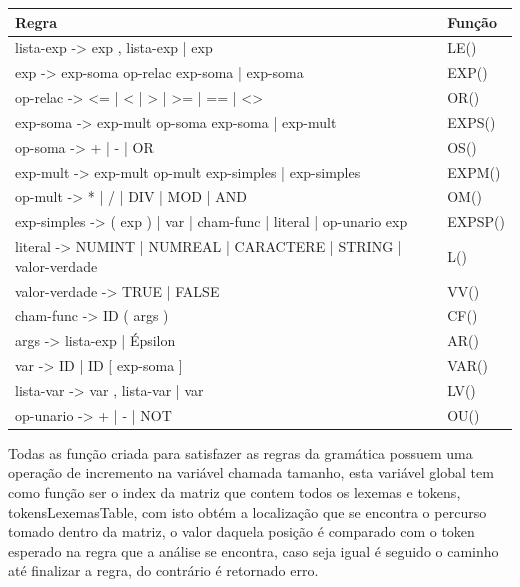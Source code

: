 \documentclass[12pt,oneside,a4paper,chapter=TITLE,section=TITLE,sumario=tradicional]{abntex2}
\begin{document}
\begin{quadro}[htb]
    \centering
    \vspace{0.5cm}
    \begin{tabular}[h]{|p{13.0cm}|p{2.0cm}|}
        \hline
        \textbf{Regra} & \textbf{Função} \\ 
        \hline\hline
	lista-exp  -> exp , lista-exp | exp  & LE() \\ \hline 
	exp -> exp-soma op-relac exp-soma | exp-soma  & EXP() \\ \hline 
	op-relac -> <= | < | > | >= | == | <>  & OR()   \\ \hline 
	exp-soma -> exp-mult op-soma exp-soma | exp-mult  & EXPS()   \\ \hline 
	op-soma -> + | - | OR  & OS()   \\ \hline 
	exp-mult -> exp-mult op-mult exp-simples | exp-simples  & EXPM()   \\ \hline 
	op-mult -> * | / | DIV | MOD | AND  & OM()   \\ \hline 
	exp-simples -> ( exp ) | var | cham-func | literal | op-unario exp  & EXPSP()   \\ \hline 
	literal -> NUMINT | NUMREAL | CARACTERE | STRING | valor-verdade  & L()   \\ \hline 
	valor-verdade -> TRUE | FALSE  & VV()   \\ \hline 
	cham-func -> ID ( args )  & CF()   \\ \hline 
	args -> lista-exp | Épsilon  & AR()   \\ \hline 
	var -> ID | ID [ exp-soma ]  & VAR()   \\ \hline 
	lista-var  -> var , lista-var | var  & LV()   \\ \hline 
	op-unario -> + | - | NOT  & OU()   \\ \hline 
    \end{tabular}
\end{quadro}

Todas as função criada para satisfazer as regras da gramática possuem uma operação de incremento na variável chamada tamanho, esta variável global tem como função ser o index da matriz que contem todos os lexemas e tokens, tokensLexemasTable, com isto obtém a localização que se encontra o percurso tomado dentro da matriz, o valor daquela posição é comparado com o token esperado na regra que a análise se encontra, caso seja igual é seguido o caminho até finalizar a regra, do contrário é retornado erro.
\end{document}

